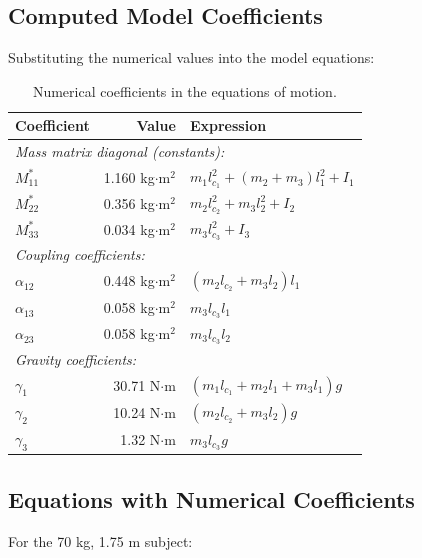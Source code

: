 \documentclass[11pt,a4paper]{article}
\begin{document}
\subsection{Computed Model Coefficients}

Substituting the numerical values into the model equations:

\begin{table}[H]
\centering
\caption{Numerical coefficients in the equations of motion.}
\label{tab:coefficients}
\begin{tabular}{@{}lrl@{}}
\toprule
\textbf{Coefficient} & \textbf{Value} & \textbf{Expression} \\
\midrule
\multicolumn{3}{l}{\textit{Mass matrix diagonal (constants):}} \\
$M_{11}^*$ & 1.160 kg$\cdot$m$^2$ & $m_1 l_{c_1}^2 + (m_2+m_3)l_1^2 + I_1$ \\
$M_{22}^*$ & 0.356 kg$\cdot$m$^2$ & $m_2 l_{c_2}^2 + m_3 l_2^2 + I_2$ \\
$M_{33}^*$ & 0.034 kg$\cdot$m$^2$ & $m_3 l_{c_3}^2 + I_3$ \\
\midrule
\multicolumn{3}{l}{\textit{Coupling coefficients:}} \\
$\alpha_{12}$ & 0.448 kg$\cdot$m$^2$ & $(m_2 l_{c_2} + m_3 l_2)l_1$ \\
$\alpha_{13}$ & 0.058 kg$\cdot$m$^2$ & $m_3 l_{c_3} l_1$ \\
$\alpha_{23}$ & 0.058 kg$\cdot$m$^2$ & $m_3 l_{c_3} l_2$ \\
\midrule
\multicolumn{3}{l}{\textit{Gravity coefficients:}} \\
$\gamma_1$ & 30.71 N$\cdot$m & $(m_1 l_{c_1} + m_2 l_1 + m_3 l_1)g$ \\
$\gamma_2$ & 10.24 N$\cdot$m & $(m_2 l_{c_2} + m_3 l_2)g$ \\
$\gamma_3$ & 1.32 N$\cdot$m & $m_3 l_{c_3} g$ \\
\bottomrule
\end{tabular}
\end{table}

\subsection{Equations with Numerical Coefficients}

For the 70 kg, 1.75 m subject:
\end{document}
